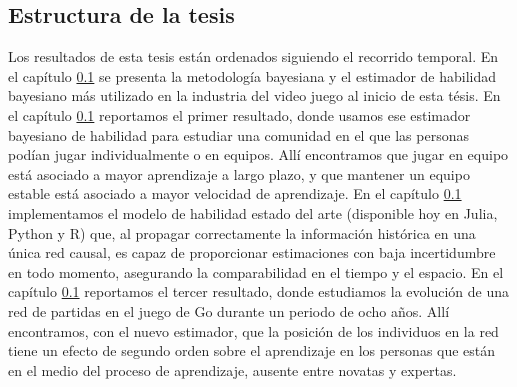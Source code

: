 \documentclass[a4paper,11pt]{book}
\theoremstyle{definition}
\begin{document}
\subsection{Estructura de la tesis}

Los resultados de esta tesis están ordenados siguiendo el recorrido temporal.
%
En el capítulo \ref{} se presenta la metodología bayesiana y el estimador de habilidad bayesiano más utilizado en la industria del video juego al inicio de esta tésis.
%
En el capítulo \ref{} reportamos el primer resultado, donde usamos ese estimador bayesiano de habilidad para estudiar una comunidad en el que las personas podían jugar individualmente o en equipos.
%
Allí encontramos que jugar en equipo está asociado a mayor aprendizaje a largo plazo, y que mantener un equipo estable está asociado a mayor velocidad de aprendizaje.
%
En el capítulo \ref{} implementamos el modelo de habilidad estado del arte (disponible hoy en Julia, Python y R) que, al propagar correctamente la información histórica en una única red causal, es capaz de proporcionar estimaciones con baja incertidumbre en todo momento, asegurando la comparabilidad en el tiempo y el espacio.
%
En el capítulo \ref{} reportamos el tercer resultado, donde estudiamos la evolución de una red de partidas en el juego de Go durante un periodo de ocho años.
%
Allí encontramos, con el nuevo estimador, que la posici\'on de los individuos en la red tiene un efecto de segundo orden sobre el aprendizaje en los personas que están en el medio del proceso de aprendizaje, ausente entre novatas y expertas.
\end{document}
